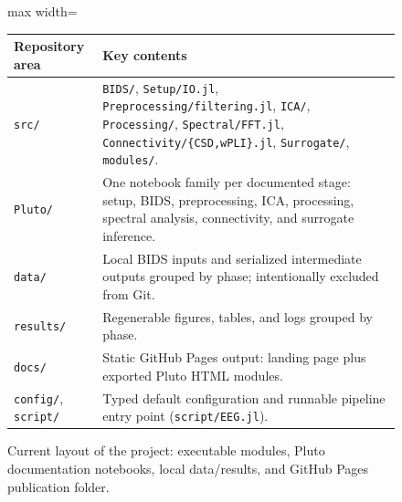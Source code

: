 \begin{figure}[H]
\centering
\scriptsize
\begin{adjustbox}{max width=\columnwidth}
\begin{tabular}{@{}p{}p{}@{}}
\toprule
\textbf{Repository area} & \textbf{Key contents} \\
\midrule
\texttt{src/} & \texttt{BIDS/}, \texttt{Setup/IO.jl}, \texttt{Preprocessing/filtering.jl}, \texttt{ICA/}, \texttt{Processing/}, \texttt{Spectral/FFT.jl}, \texttt{Connectivity/\{CSD,wPLI\}.jl}, \texttt{Surrogate/}, \texttt{modules/}. \\
\addlinespace
\texttt{Pluto/} & One notebook family per documented stage: setup, BIDS, preprocessing, ICA, processing, spectral analysis, connectivity, and surrogate inference. \\
\addlinespace
\texttt{data/} & Local BIDS inputs and serialized intermediate outputs grouped by phase; intentionally excluded from Git. \\
\addlinespace
\texttt{results/} & Regenerable figures, tables, and logs grouped by phase. \\
\addlinespace
\texttt{docs/} & Static GitHub Pages output: landing page plus exported Pluto HTML modules. \\
\addlinespace
\texttt{config/}, \texttt{script/} & Typed default configuration and runnable pipeline entry point (\texttt{script/EEG.jl}). \\
\bottomrule
\end{tabular}
\end{adjustbox}
\caption{Current layout of the \Julia{} project: executable modules, Pluto documentation notebooks, local data/results, and GitHub Pages publication folder.}
\label{fig:julia-tree}
\end{figure}
